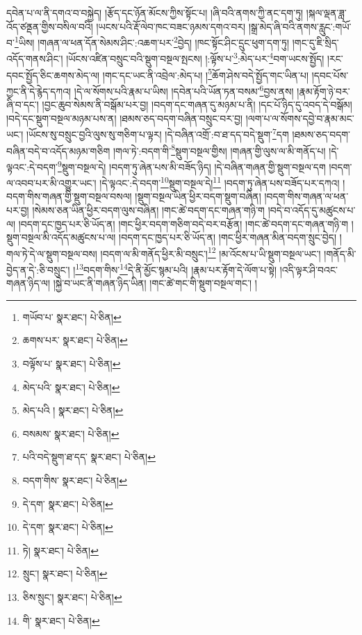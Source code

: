 དབེན་པ་ལ་ནི་དགའ་བ་བསྐྱེད། །རྩོད་དང་ཉོན་མོངས་ཀྱིས་སྟོང་པ། །ཞི་བའི་ནགས་ཀྱི་ནང་དག་ཏུ། །སྐལ་ལྡན་ཟླ་འོད་ཙནྡན་གྱིས་བསིལ་བའི། །ཡངས་པའི་རྡོ་ལེབ་ཁང་བཟང་ཉམས་དགའ་བར། །སྒྲ་མེད་ཞི་བའི་ནགས་རླུང་:གཡོ་བ་\footnote{གཡོབ་པ་  སྣར་ཐང་།  པེ་ཅིན། }ཡིས། །གཞན་ལ་ཕན་དོན་སེམས་ཤིང་:འཆག་པར་\footnote{ཆགས་པར་  སྣར་ཐང་།  པེ་ཅིན། }བྱེད། །ཁང་སྟོང་ཤིང་དྲུང་ཕུག་དག་ཏུ། །གང་དུ་ཇི་སྲིད་འདོད་གནས་ཤིང་། །ཡོངས་འཛིན་བསྲུང་བའི་སྡུག་བསྔལ་སྤངས། །:ལྟོས་པ་\footnote{བལྟོས་པ་  སྣར་ཐང་།  པེ་ཅིན། }:མེད་པར་\footnote{མེད་པའི་  སྣར་ཐང་།  པེ་ཅིན། }བག་ཡངས་སྤྱོད། །རང་དབང་སྤྱོད་ཅིང་ཆགས་མེད་ལ། །གང་དང་ཡང་ནི་འབྲེལ་:མེད་པ། །\footnote{མེད་པའི །  སྣར་ཐང་།  པེ་ཅིན། }ཆོག་ཤེས་བདེ་སྤྱོད་གང་ཡིན་པ། །དབང་པོས་ཀྱང་ནི་དེ་རྙེད་དཀའ། །དེ་ལ་སོགས་པའི་རྣམ་པ་ཡིས། །དབེན་པའི་ཡོན་ཏན་བསམ་\footnote{བསམས་  སྣར་ཐང་།  པེ་ཅིན། }བྱས་ནས། །རྣམ་རྟོག་ཉེ་བར་ཞི་བ་དང་། །བྱང་ཆུབ་སེམས་ནི་བསྒོམ་པར་བྱ། །བདག་དང་གཞན་དུ་མཉམ་པ་ནི། །དང་པོ་ཉིད་དུ་འབད་དེ་བསྒོམ། །བདེ་དང་སྡུག་བསྔལ་མཉམ་པས་ན། །ཐམས་ཅད་བདག་བཞིན་བསྲུང་བར་བྱ། །ལག་པ་ལ་སོགས་དབྱེ་བ་རྣམ་མང་ཡང་། །ཡོངས་སུ་བསྲུང་བྱའི་ལུས་སུ་གཅིག་པ་ལྟར། །དེ་བཞིན་འགྲོ་:བ་ཐ་དད་བདེ་སྡུག་\footnote{པའི་བདེ་སྡུག་ཐ་དད་  སྣར་ཐང་།  པེ་ཅིན། }དག །ཐམས་ཅད་བདག་བཞིན་བདེ་བ་འདོད་མཉམ་གཅིག །གལ་ཏེ་:བདག་གི་\footnote{བདག་གིས་  སྣར་ཐང་།  པེ་ཅིན། }སྡུག་བསྔལ་གྱིས། །གཞན་གྱི་ལུས་ལ་མི་གནོད་པ། །དེ་ལྟའང་:དེ་བདག་\footnote{དེ་དག་  སྣར་ཐང་།  པེ་ཅིན། }སྡུག་བསྔལ་དེ། །བདག་ཏུ་ཞེན་པས་མི་བཟོད་ཉིད། །དེ་བཞིན་གཞན་གྱི་སྡུག་བསྔལ་དག །བདག་ལ་འབབ་པར་མི་འགྱུར་ཡང་། །དེ་ལྟའང་:དེ་བདག་\footnote{དེ་དག་  སྣར་ཐང་།  པེ་ཅིན། }སྡུག་བསྔལ་དེ།\footnote{ཏེ།  སྣར་ཐང་།  པེ་ཅིན། } །བདག་ཏུ་ཞེན་པས་བཟོད་པར་དཀའ། །བདག་གིས་གཞན་གྱི་སྡུག་བསྔལ་བསལ། །སྡུག་བསྔལ་ཡིན་ཕྱིར་བདག་སྡུག་བཞིན། །བདག་གིས་གཞན་ལ་ཕན་པར་བྱ། །སེམས་ཅན་ཡིན་ཕྱིར་བདག་ལུས་བཞིན། །གང་ཚེ་བདག་དང་གཞན་གཉི་ག །བདེ་བ་འདོད་དུ་མཚུངས་པ་ལ། །བདག་དང་ཁྱད་པར་ཅི་ཡོད་ན། །གང་ཕྱིར་བདག་གཅིག་བདེ་བར་བརྩོན། །གང་ཚེ་བདག་དང་གཞན་གཉི་ག །སྡུག་བསྔལ་མི་འདོད་མཚུངས་པ་ལ། །བདག་དང་ཁྱད་པར་ཅི་ཡོད་ན། །གང་ཕྱིར་གཞན་མིན་བདག་སྲུང་བྱེད། །གལ་ཏེ་དེ་ལ་སྡུག་བསྔལ་བས། །བདག་ལ་མི་གནོད་ཕྱིར་མི་བསྲུང་།\footnote{སྲུང་།  སྣར་ཐང་།  པེ་ཅིན། } །མ་འོངས་པ་ཡི་སྡུག་བསྔལ་ཡང་། །གནོད་མི་བྱེད་ན་དེ་:ཅི་བསྲུང་། །\footnote{ཅིས་སྲུང་།   སྣར་ཐང་།  པེ་ཅིན། }བདག་གིས་\footnote{གི་  སྣར་ཐང་།  པེ་ཅིན། }དེ་ནི་མྱོང་སྙམ་པའི། །རྣམ་པར་རྟོག་དེ་ལོག་པ་སྟེ། །འདི་ལྟར་ཤི་བའང་གཞན་ཉིད་ལ། །སྐྱེ་བ་ཡང་ནི་གཞན་ཉིད་ཡིན། །གང་ཚེ་གང་གི་སྡུག་བསྔལ་གང་། །
